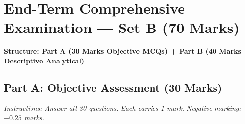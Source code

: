 \section{End-Term Comprehensive Examination --- Set B (70 Marks)}
\label{sec:endterm_set_b}


\begin{center}
\sffamily\textbf{\color{AlertRed}Structure: Part A (30 Marks Objective MCQs) + Part B (40 Marks Descriptive Analytical)}
\end{center}

\subsection*{Part A: Objective Assessment (30 Marks)}
\textit{Instructions: Answer all 30 questions. Each carries 1 mark. Negative marking: $-0.25$ marks.}


